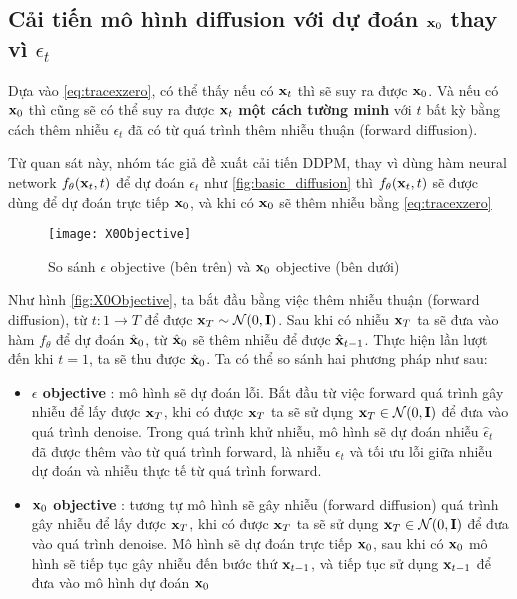 \subsection{Cải tiến mô hình diffusion với dự đoán $\mathbf{x}_0$ thay vì $\epsilon_t$}
\label{subsec:X0Objective}

Dựa vào \autoref{eq:tracexzero}, có thể thấy nếu có $\mathbf{x}_{t}$ thì sẽ suy ra được $\mathbf{x}_0$. Và nếu có $\mathbf{x}_0$ thì cũng sẽ có thể suy ra được $\mathbf{x}_{t}$ \textbf{một cách tường minh} với $t$ bất kỳ bằng cách thêm nhiễu $\epsilon_t$ đã có từ quá trình thêm nhiễu thuận (forward diffusion).

Từ quan sát này, nhóm tác giả \cite{nichol2021improved} đề xuất cải tiến DDPM, thay vì dùng hàm neural network $f_{\theta}(\mathbf{x}_t, t)$ để dự đoán $\epsilon_t$ như \autoref{fig:basic_diffusion} thì $f_{\theta}(\mathbf{x}_t, t)$ sẽ được dùng để dự đoán trực tiếp $\mathbf{x}_0$, và khi có $\mathbf{x}_0$ sẽ thêm nhiễu bằng  \autoref{eq:tracexzero}


\begin{figure}[H]
	\captionsetup{skip=2pt}
	\texttt{[image: X0Objective]}
	\caption{So sánh $\epsilon$ objective (bên trên) và  $\mathbf{x}_0$ objective (bên dưới)}
	\label{fig:X0Objective}
\end{figure}

Như hình \autoref{fig:X0Objective}, ta bắt đầu bằng việc thêm nhiễu thuận (forward diffusion), từ $t: 1 \rightarrow T$ để được $\mathbf{x}_T \sim \mathcal{N} (0, \mathbf{I})$. Sau khi có nhiễu $\mathbf{x}_{T}$ ta sẽ đưa vào hàm $f_{\theta}$ để dự đoán $\hat{\mathbf{x}}_0$, từ $\hat{\mathbf{x}}_0$ sẽ thêm nhiễu để được $\hat{\mathbf{x}}_{t-1}$. Thực hiện lần lượt đến khi $t = 1$, ta sẽ thu được $\hat{\mathbf{x}}_0$. Ta có thể so sánh hai phương pháp như sau:

\begin{itemize}
	\item \textbf{$\epsilon$  objective} :  mô hình sẽ dự đoán lỗi. Bắt đầu từ việc forward quá trình gây nhiễu để lấy được $\mathbf{x}_T$, khi có được $\mathbf{x}_T$ ta sẽ sử dụng $\mathbf{x}_T \in \mathcal{N}(0, \mathbf{I})$ để đưa vào quá trình denoise. Trong quá trình khử nhiễu, mô hình sẽ dự đoán nhiễu $\hat{\epsilon}_t$ đã được thêm vào từ quá trình forward, là nhiễu $\epsilon_t$ và tối ưu lỗi giữa nhiễu dự đoán và nhiễu thực tế từ quá trình forward.
	\item \textbf{$\mathbf{x}_0$ objective} : tương tự mô hình sẽ gây nhiễu (forward diffusion) quá trình gây nhiễu để lấy được $\mathbf{x}_T$, khi có được $\mathbf{x}_T$ ta sẽ sử dụng $\mathbf{x}_T \in \mathcal{N}(0, \mathbf{I})$ để đưa vào quá trình denoise. Mô hình sẽ dự đoán trực tiếp $\mathbf{x}_0$, sau khi có $\mathbf{x}_0$ mô hình sẽ tiếp tục gây nhiễu đến bước thứ $\mathbf{x}_{t-1}$, và tiếp tục sử dụng $\mathbf{x}_{t-1}$ để đưa vào mô hình dự đoán $\mathbf{x}_0$
\end{itemize}

